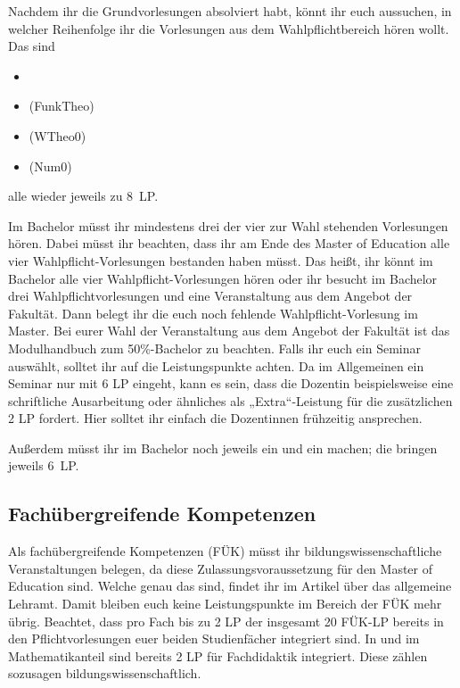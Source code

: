 Nachdem ihr die Grundvorlesungen absolviert habt, könnt ihr euch aussuchen, in welcher Reihenfolge ihr die Vorlesungen aus dem Wahlpflichtbereich hören wollt. Das sind
\begin{itemize}
  \item {}
  \item {} (\gls{FunkTheo})
  \item {} (\gls{WTheo0})
  \item {} (\gls{Num0})
\end{itemize}
alle wieder jeweils zu 8~\gls{LP}.

Im Bachelor müsst ihr mindestens drei der vier zur Wahl stehenden Vorlesungen hören. Dabei müsst ihr beachten, dass ihr am Ende des Master of Education alle vier Wahlpflicht-Vorlesungen bestanden haben müsst. Das heißt, ihr könnt im Bachelor alle vier Wahlpflicht-Vorlesungen hören oder ihr besucht im Bachelor drei Wahlpflichtvorlesungen und eine Veranstaltung aus dem Angebot der Fakultät. Dann belegt ihr die euch noch fehlende Wahlpflicht-Vorlesung im Master. Bei eurer Wahl der Veranstaltung aus dem Angebot der Fakultät ist das Modulhandbuch zum 50\%-Bachelor zu beachten. Falls ihr euch ein Seminar auswählt, solltet ihr auf die Leistungspunkte achten. Da im Allgemeinen ein Seminar nur mit 6 \gls{LP} eingeht, kann es sein, dass die Dozentin beispielsweise eine schriftliche Ausarbeitung oder ähnliches als „Extra“-Leistung für die zusätzlichen 2 \gls{LP} fordert. Hier solltet ihr einfach die Dozentinnen frühzeitig ansprechen.

Außerdem müsst ihr im Bachelor noch jeweils ein  und ein  machen; die bringen jeweils 6~\gls{LP}.

\subsection{Fachübergreifende Kompetenzen}

Als fachübergreifende Kompetenzen (FÜK) müsst ihr bildungswissenschaftliche Veranstaltungen belegen, da diese Zulassungsvoraussetzung für den Master of Education sind. Welche genau das sind, findet ihr im Artikel über das allgemeine Lehramt. Damit bleiben euch keine Leistungspunkte im Bereich der FÜK mehr übrig. Beachtet, dass pro Fach bis zu 2 \gls{LP} der insgesamt 20 FÜK-\gls{LP} bereits in den Pflichtvorlesungen euer beiden Studienfächer integriert sind. In  und  im Mathematikanteil sind bereits 2 \gls{LP} für Fachdidaktik integriert. Diese zählen sozusagen bildungswissenschaftlich.

